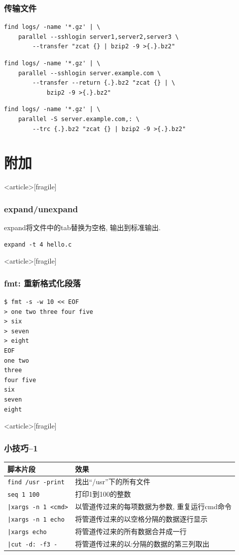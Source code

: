 \documentclass[compress]{beamer}
\begin{document}
\begin{frame}[fragile]
    \frametitle{传输文件}
\begin{Verbatim}
find logs/ -name '*.gz' | \
    parallel --sshlogin server1,server2,server3 \
        --transfer "zcat {} | bzip2 -9 >{.}.bz2"
\end{Verbatim}
\begin{Verbatim}
find logs/ -name '*.gz' | \
    parallel --sshlogin server.example.com \
        --transfer --return {.}.bz2 "zcat {} | \
            bzip2 -9 >{.}.bz2"
\end{Verbatim}
\begin{Verbatim}
find logs/ -name '*.gz' | \
    parallel -S server.example.com,: \
        --trc {.}.bz2 "zcat {} | bzip2 -9 >{.}.bz2"
\end{Verbatim}
\end{frame}

\section<article>{附加}

\begin{frame}<article>[fragile]
	\frametitle{expand/unexpand}
	expand将文件中的tab替换为空格, 输出到标准输出.

\begin{Verbatim}
expand -t 4 hello.c
\end{Verbatim}

\end{frame}

\begin{frame}<article>[fragile]
\frametitle{fmt: 重新格式化段落}
\begin{Verbatim}
$ fmt -s -w 10 << EOF
> one two three four five
> six
> seven
> eight
EOF
one two
three
four five
six
seven
eight
\end{Verbatim}
\end{frame}

\begin{frame}<article>[fragile]
    \frametitle{小技巧--1}

    \begin{tabular}{|l|p{6cm}|} \hline
脚本片段 & 效果 \\ \hline\hline
\verb~find /usr -print~ & 找出``/usr''下的所有文件  \\ \hline
\verb~seq 1 100~ & 打印1到100的整数 \\ \hline
\verb~|xargs -n 1 <cmd>~ & 以管道传过来的每项数据为参数, 重复运行cmd命令 \\ \hline
\verb~|xargs -n 1 echo~ & 将管道传过来的以空格分隔的数据逐行显示  \\ \hline
\verb~|xargs echo~ & 将管道传过来的所有数据合并成一行 \\ \hline
\verb~|cut -d: -f3 -~ & 将管道传过来的以:分隔的数据的第三列取出 \\ \hline
\end{tabular}

\end{frame}
\end{document}
